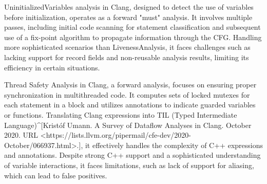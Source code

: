 UninitializedVariables analysis in Clang, designed to detect the use of variables before initialization, operates as a forward "must" analysis. It involves multiple passes, including initial code scanning for statement classification and subsequent use of a fix-point algorithm to propagate information through the CFG. Handling more sophisticated scenarios than LivenessAnalysis, it faces challenges such as lacking support for record fields and non-reusable analysis results, limiting its efficiency in certain situations.

\begin{markdown}
Thread Safety Analysis in Clang, a forward analysis, focuses on ensuring proper synchronization in multithreaded code. It computes sets of locked mutexes for each statement in a block and utilizes annotations to indicate guarded variables or functions. Translating Clang expressions into TIL (Typed Intermediate Language)^[Kristóf Umann. A Survey of Dataflow Analyses in Clang. October 2020. URL <https://lists.llvm.org/pipermail/cfe-dev/2020-October/066937.html>.], it effectively handles the complexity of C++ expressions and annotations. Despite strong C++ support and a sophisticated understanding of variable interactions, it faces limitations, such as lack of support for aliasing, which can lead to false positives.
\end{markdown}









